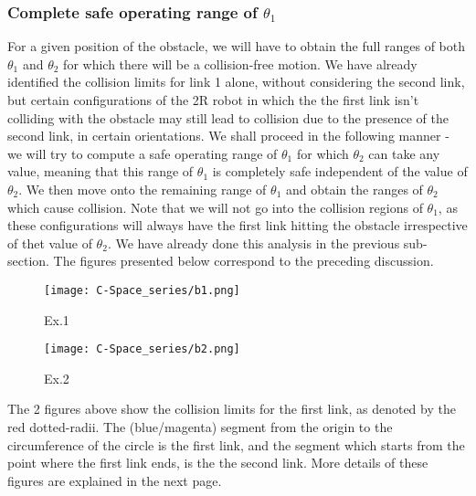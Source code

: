 \documentclass[12pt]{article}
\begin{document}
\subsubsection{Complete safe operating range of $\theta_1$}
For a given position of the obstacle, we will have to obtain the full ranges of both $\theta_1$ and $\theta_2$ for which there will be a collision-free motion. We have already identified the collision limits for link 1 alone, without considering the second link, but certain configurations of the 2R robot in which the the first link isn't colliding with the obstacle may still lead to collision due to the presence of the second link, in certain orientations.
\newline
\newline
We shall proceed in the following manner - we will try to compute a safe operating range of $\theta_1$ for which $\theta_2$ can take any value, meaning that this range of $\theta_1$ is completely safe independent of the value of $\theta_2$. We then move onto the remaining range of $\theta_1$ and obtain the ranges of $\theta_2$ which cause collision. Note that we will not go into the collision regions of $\theta_1$, as these configurations will always have the first link hitting the obstacle irrespective of thet value of $\theta_2$. We have already done this analysis in the previous sub-section.
\newline
\newline
The figures presented below correspond to the preceding discussion.
\begin{figure}[h!]
    \centering
    \begin{minipage}{0.49\textwidth}
        \centering
        \texttt{[image: C-Space\_series/b1.png]}
        \caption{Ex.1}
        \label{fig:b1}
    \end{minipage}
    \hfill
    \begin{minipage}{0.49\textwidth}
        \centering
        \texttt{[image: C-Space\_series/b2.png]}
        \caption{Ex.2}
        \label{fig:a2}
    \end{minipage}
\end{figure}
\newline
The 2 figures above show the collision limits for the first link, as denoted by the red dotted-radii. The (blue/magenta) segment from the origin to the circumference of the circle is the first link, and the segment which starts from the point where the first link ends, is the the second link. More details of these figures are explained in the next page.
\end{document}
